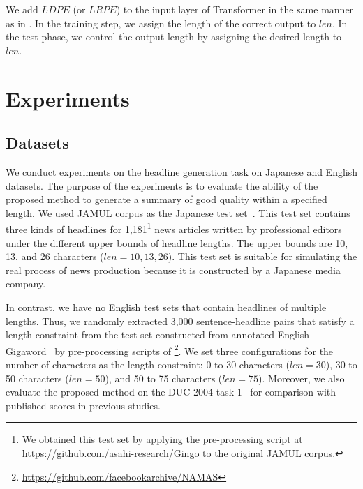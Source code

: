 \documentclass[11pt,a4paper]{article}
\begin{document}
We add $LDPE$ (or $LRPE$) to the input layer of Transformer in the same manner as in .
In the training step, we assign the length of the correct output to $len$.
In the test phase, we control the output length by assigning the desired length to $len$.


\section{Experiments}
\subsection{Datasets}
We conduct experiments on the headline generation task on Japanese and English datasets.
The purpose of the experiments is to evaluate the ability of the proposed method to generate a summary of good quality within a specified length.
We used JAMUL corpus as the Japanese test set~\cite{Hitomi2019}.
This test set contains three kinds of headlines for 1,181\footnote{We obtained this test set by applying the pre-processing script at \href{https://github.com/asahi-research/Gingo}{https://github.com/asahi-research/Gingo} to the original JAMUL corpus.} news articles written by professional editors under the different upper bounds of headline lengths.
The upper bounds are 10, 13, and 26 characters ($len = 10, 13, 26$).
This test set is suitable for simulating the real process of news production because it is constructed by a Japanese media company.



In contrast, we have no English test sets that contain headlines of multiple lengths.
Thus, we randomly extracted 3,000 sentence-headline pairs that satisfy a length constraint from the test set constructed from annotated English Gigaword~\cite{napoles:2012:AG} by pre-processing scripts of \footnote{\href{https://github.com/facebookarchive/NAMAS}{https://github.com/facebookarchive/NAMAS}}.
We set three configurations for the number of characters as the length constraint: 0 to 30 characters ($len=30$), 30 to 50 characters ($len=50$), and 50 to 75 characters ($len=75$).
Moreover, we also evaluate the proposed method on the DUC-2004 task 1~\cite{Over:2007:DC:1284916.1285157} for comparison with published scores in previous studies.
\end{document}
